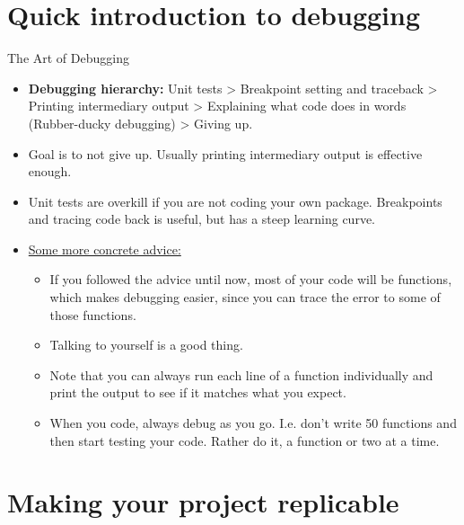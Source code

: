 \documentclass[aspectratio=169,xcolor=dvipsnames]{beamer}
\begin{document}
\section{Quick introduction to debugging}

\begin{frame}[t]{The Art of Debugging}
  \begin{itemize}
    \item \textbf{Debugging hierarchy:} Unit tests \pause > Breakpoint setting and traceback \pause > Printing intermediary output \pause > Explaining what code does in words (Rubber-ducky debugging) \pause > Giving up.\pause
    \item Goal is to not give up. \alert{Usually printing intermediary output is effective enough.}\pause
    \item Unit tests are overkill if you are not coding your own package. Breakpoints and tracing code back is useful, but has a steep learning curve.\pause
    \item \underline{Some more concrete advice:}\pause
    \begin{itemize}
      \item If you followed the advice until now, most of your code will be functions, which makes debugging easier, since you can trace the error to some of those functions.\pause
      \item \alert{Talking to yourself is a good thing.}\pause
      \item Note that you can always run each line of a function individually and print the output to see if it matches what you expect.\pause
      \item \alert{When you code, always debug as you go.} I.e. don't write 50 functions and then start testing your code. Rather do it, a function or two at a time.
    \end{itemize}
  \end{itemize}
\end{frame}


\section{Making your project replicable}
\end{document}
